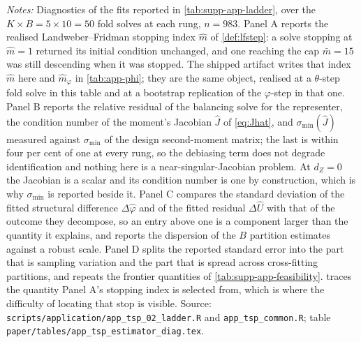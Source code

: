 \documentclass[
  12pt]{article}
\newcommand{\1}[1]{\mathds{1}\left[#1\right]}
\theoremstyle{plain}
\theoremstyle{definition}
\theoremstyle{definition}
\theoremstyle{remark}
\begin{document}
\begin{table}[!htbp]
\centering
\begin{threeparttable}
\caption{What the estimator did: stopping, conditioning, component scale, and
the variance decomposition}
\label{tab:supp-app-diag}
\footnotesize

\begin{tablenotes}\footnotesize
\item \textit{Notes:} Diagnostics of the fits reported in
\cref{tab:supp-app-ladder}, over the $K\times B=5\times10=50$ fold solves at
each rung, $n=983$. Panel A reports the realised Landweber--Fridman stopping
index $\hat m$ of \cref{def:lfstep}: a solve stopping at $\hat m=1$ returned its
initial condition unchanged, and one reaching the cap $\bar m=15$ was still
descending when it was stopped. The shipped artifact writes that index $\hat m$
here and $\hat m_\varphi$ in \cref{tab:app-phi}; they are the same object,
realised at a $\theta$-step fold solve in this table and at a bootstrap
replication of the $\varphi$-step in that one. Panel B reports the relative residual of the
balancing solve for the representer, the condition number of the moment's
Jacobian $\hat J$ of \eqref{eq:Jhat}, and $\sigma_{\min}(\hat J)$ measured
against $\sigma_{\min}$ of the design second-moment matrix; the last is within
four per cent of one at every rung, so the debiasing term does not degrade
identification and nothing here is a near-singular-Jacobian problem. At $d_Z=0$
the Jacobian is a scalar and its condition number is one by construction, which
is why $\sigma_{\min}$ is reported beside it. Panel C compares the standard
deviation of the fitted structural difference $\Delta\hat\varphi$ and of the
fitted residual $\Delta\hat U$ with that of the outcome they decompose, so an
entry above one is a component larger than the quantity it explains, and reports
the dispersion of the $B$ partition estimates against a robust scale. Panel D
splits the reported standard error into the part that is sampling variation and
the part that is spread across cross-fitting partitions, and repeats the
frontier quantities of \cref{tab:supp-app-feasibility}. 
traces the quantity Panel A's stopping index is selected from, which is where
the difficulty of locating that stop is visible. Source:
\texttt{scripts/application/app\_tsp\_02\_ladder.R} and
\texttt{app\_tsp\_common.R}; table
\texttt{paper/tables/app\_tsp\_estimator\_diag.tex}.
\end{tablenotes}
\end{threeparttable}
\end{table}
\end{document}
